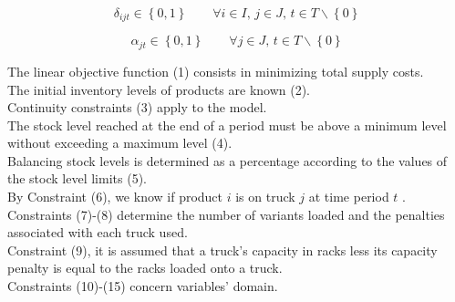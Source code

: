\documentclass[a4paper,12pt,titlepage]{article}
\begin{document}
  \begin{equation*}
 \delta_{ijt} \in \left\lbrace 0,1 \right\rbrace \qquad \forall i\in I,\, j\in J,\, t\in T\backslash\left\lbrace 0\right\rbrace
 \tag{14}
 \end{equation*}
 
  \begin{equation*}
 \alpha_{jt} \in \left\lbrace 0,1 \right\rbrace  \qquad \forall j\in J,\, t\in T\backslash\left\lbrace 0\right\rbrace
 \tag{15}
 \end{equation*}
 
 \newpage
 The linear objective function (1) consists in minimizing total supply costs.\\
 The initial inventory levels of products are known (2).\\ Continuity constraints (3) apply to the model. \\
 The stock level reached at the end of a period must be above a
 minimum level without exceeding a maximum level (4).\\ Balancing stock levels is
 determined as a percentage according to the values of the stock level limits (5).\\
 By Constraint (6), we know if product $i$ is on truck $j$ at time period $t$ .\\
 Constraints (7)-(8) determine the number of variants loaded and the penalties associated with
 each truck used.\\
  Constraint (9), it is assumed that a truck’s capacity in
 racks less its capacity penalty is equal to the racks loaded onto a truck.\\
 Constraints (10)-(15) concern variables' domain.
 
 
 
 
 
 
\end{document}
